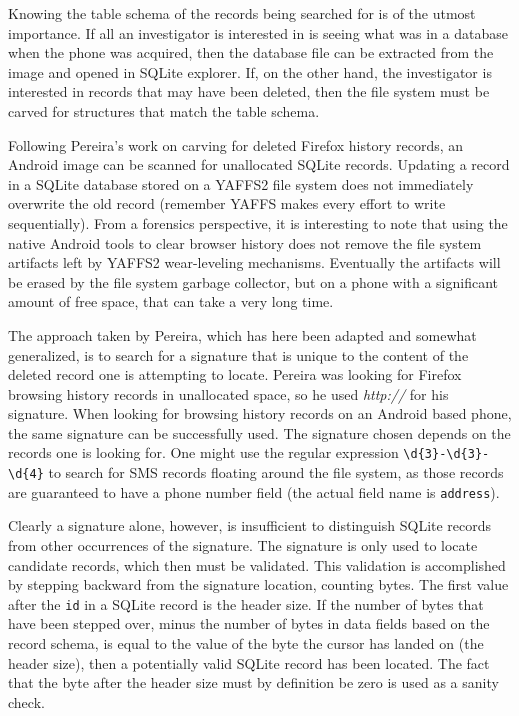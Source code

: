 Knowing the table schema of the records being searched for is of the utmost importance.  If all an investigator is interested in is
seeing what was in a database when the phone was acquired, then the database file can be extracted from the image and opened in
SQLite explorer.  If, on the other hand, the investigator is interested in records that may have been deleted, then the file system
must be carved for structures that match the table schema.

Following Pereira's work on carving for deleted Firefox history records, an Android image can be scanned for unallocated SQLite
records.  Updating a record in a SQLite database stored on a YAFFS2 file system does not immediately overwrite the old record
(remember YAFFS makes every effort to write sequentially).  From a forensics perspective, it is interesting to note that using the
native Android tools to clear browser history does not remove the file system artifacts left by YAFFS2 wear-leveling mechanisms.
Eventually the artifacts will be erased by the file system garbage collector, but on a phone with a significant amount of free space,
that can take a very long time.

The approach taken by Pereira, which has here been adapted and somewhat generalized, is to search for a signature that is unique to
the content of the deleted record one is attempting to locate.  Pereira was looking for Firefox browsing history records in
unallocated space, so he used \emph{http://} for his signature.  When looking for browsing history records on an Android based
phone, the same signature can be successfully used.  The signature chosen depends on the records one is looking for.  One might use
the regular expression \verb|\d{3}-\d{3}-\d{4}| to search for SMS records floating around the file system, as those records are guaranteed
to have a phone number field (the actual field name is \texttt{address}). 

Clearly a signature alone, however, is insufficient to distinguish SQLite records from other occurrences of the signature.  The
signature is only used to locate candidate records, which then must be validated.  This validation is accomplished by stepping
backward from the signature location, counting bytes.  The first value after the \texttt{id} in a SQLite record is the header size.
If the number of bytes that have been stepped over, minus the number of bytes in data fields based on the record schema, is equal to
the value of the byte the cursor has landed on (the header size), then a potentially valid SQLite record has been located.  The fact
that the byte after the header size must by definition be zero is used as a sanity check.

